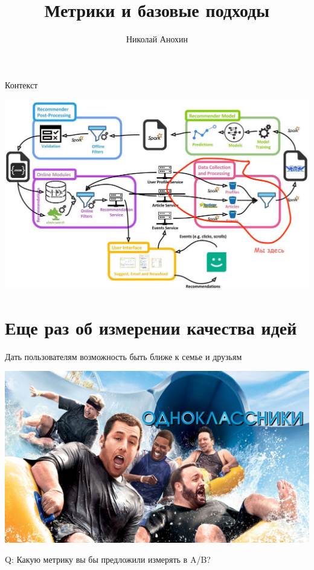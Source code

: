 \documentclass[11pt,aspectratio=169,handout]{beamer}
\author{Николай Анохин}
\title{Метрики и базовые подходы}
\begin{document}
{

\begin{frame}
\titlepage
\end{frame}

}

\begin{frame}{Контекст}

\begin{center}
\includegraphics[scale=0.23]{images/mendeley.jpeg}
\end{center}

\end{frame}

\section{Еще раз об измерении качества идей}

\begin{frame}{}

\begin{tcolorbox}[colback=gray!5,colframe=gray!80,title=Миссия компании]
Дать пользователям возможность быть ближе к семье и друзьям
\end{tcolorbox}

\vfill

\begin{center}
\includegraphics[scale=0.1]{images/odnoklassniki.jpeg}
\end{center}

\vfill

Q: Какую метрику вы бы предложили измерять в A/B?

\end{frame}
\end{document}
